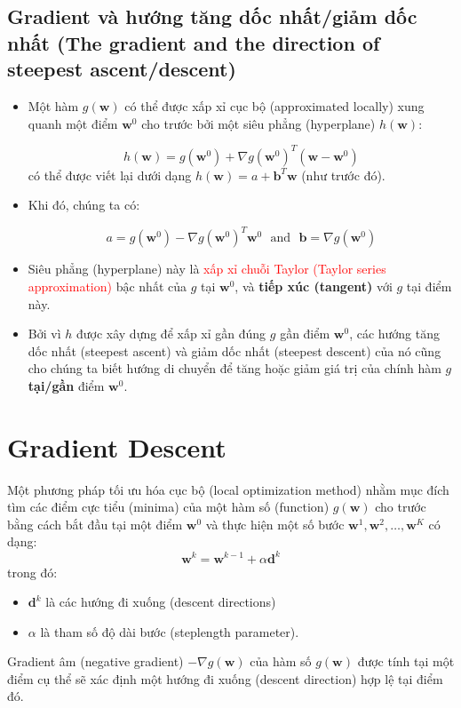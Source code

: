 \documentclass{book}
\begin{document}
\subsection{Gradient và hướng tăng dốc nhất/giảm dốc nhất (The gradient and the direction of steepest ascent/descent)}
\begin{itemize}
    \item Một hàm $g(\mathbf{w})$ có thể được xấp xỉ cục bộ (approximated locally) xung quanh một điểm $\mathbf{w}^0$ cho trước bởi một siêu phẳng (hyperplane) $h(\mathbf{w})$:

    \begin{equation*}
        h(\mathbf{w})=g(\mathbf{w}^0)+\nabla g(\mathbf{w}^0)^T(\mathbf{w}-\mathbf{w}^0)
    \end{equation*}
    có thể được viết lại dưới dạng $h(\mathbf{w})=a+\mathbf{b}^T\mathbf{w}$ (như trước đó).
    \item Khi đó, chúng ta có:
    
    \begin{equation*}
        a = g(\mathbf{w}^0)-\nabla g(\mathbf{w}^0)^T\mathbf{w}^0 \,\,\,\, \text{and} \,\,\,\, \mathbf{b}=\nabla g(\mathbf{w}^0)
    \end{equation*}
    \item Siêu phẳng (hyperplane) này là \textcolor{red}{xấp xỉ chuỗi Taylor (Taylor series approximation)} bậc nhất của $g$ tại $\mathbf{w}^0$, và \textbf{tiếp xúc (tangent)} với $g$ tại điểm này.
    \item Bởi vì $h$ được xây dựng để xấp xỉ gần đúng $g$ gần điểm $\mathbf{w}^0$, các hướng tăng dốc nhất (steepest ascent) và giảm dốc nhất (steepest descent) của nó cũng cho chúng ta biết hướng di chuyển để tăng hoặc giảm giá trị của chính hàm $g$ \textbf{tại/gần} điểm $\mathbf{w}^0$.
\end{itemize}
\section{Gradient Descent}
Một phương pháp tối ưu hóa cục bộ (local optimization method) nhằm mục đích tìm các điểm cực tiểu (minima) của một hàm số (function) $g(\mathbf{w})$ cho trước bằng cách bắt đầu tại một điểm $\mathbf{w}^0$ và thực hiện một số bước $\mathbf{w}^1,\mathbf{w}^2,\ldots,\mathbf{w}^K$ có dạng:
\begin{equation*}
\mathbf{w}^k =\mathbf{w}^{k-1}+\alpha\mathbf{d}^k
\end{equation*}
trong đó:
\begin{itemize}
    \item $\mathbf{d}^k$ là các hướng đi xuống (descent directions)
    \item $\alpha$ là tham số độ dài bước (steplength parameter).
\end{itemize}
Gradient âm (negative gradient) $-\nabla g(\mathbf{w})$ của hàm số $g(\mathbf{w})$ được tính tại một điểm cụ thể sẽ xác định một hướng đi xuống (descent direction) hợp lệ tại điểm đó.
\end{document}
